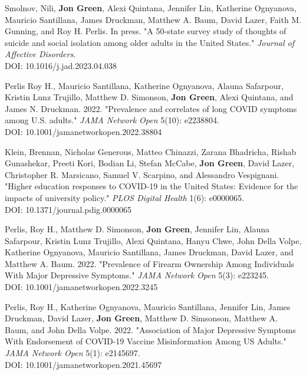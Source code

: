 \documentclass[letterpaper]{article}
\begin{document}
\begin{etaremune}

\item Smolnov, Nili, \textbf{Jon Green}, Alexi Quintana, Jennifer Lin, Katherine Ognyanova, Mauricio Santillana, James Druckman, Matthew A. Baum, David Lazer, Faith M. Gunning, and Roy H. Perlis. In press. "A 50-state survey study of thoughts of suicide and social isolation among older adults in the United States." \textit{Journal of Affective Disorders}. \\
DOI: 10.1016/j.jad.2023.04.038

\item Perlis Roy H., Mauricio Santillana, Katherine Ognyanova, Alauna Safarpour, Kristin Lunz Trujillo, Matthew D. Simonson, \textbf{Jon Green}, Alexi Quintana, and James N. Druckman. 2022. "Prevalence and correlates of long COVID symptoms among U.S. adults." \textit{JAMA Network Open} 5(10): e2238804. \\
DOI: 10.1001/jamanetworkopen.2022.38804

\item Klein, Brennan, Nicholas Generous, Matteo Chinazzi, Zarana Bhadricha, Rishab Gunashekar, Preeti Kori, Bodian Li, Stefan McCabe, \textbf{Jon Green}, David Lazer, Christopher R. Marsicano, Samuel V. Scarpino, and Alessandro Vespignani. "Higher education responses to COVID-19 in the United States: Evidence for the impacts of university policy." \textit{PLOS Digital Health} 1(6): e0000065. \\
DOI: 10.1371/journal.pdig.0000065

\item  Perlis, Roy H., Matthew D. Simonson, \textbf{Jon Green}, Jennifer Lin, Alauna Safarpour, Kristin Lunz Trujillo, Alexi Quintana, Hanyu Chwe, John Della Volpe, Katherine Ognyanova, Mauricio Santillana,  James Druckman, David Lazer, and Matthew A. Baum. 2022. "Prevalence of Firearm Ownership Among Individuals With Major Depressive Symptoms." \textit{JAMA Network Open} 5(3): e223245. \\
DOI: 10.1001/jamanetworkopen.2022.3245

\item  Perlis, Roy H., Katherine Ognyanova, Mauricio Santillana, Jennifer Lin, James Druckman, David Lazer,  \textbf{Jon Green}, Matthew D. Simsonson, Matthew A. Baum, and John Della Volpe. 2022. "Association of Major Depressive Symptoms With Endorsement of COVID-19 Vaccine Misinformation Among US Adults." \textit{JAMA Network Open} 5(1): e2145697. \\
DOI: 10.1001/jamanetworkopen.2021.45697


\end{etaremune}
\end{document}
